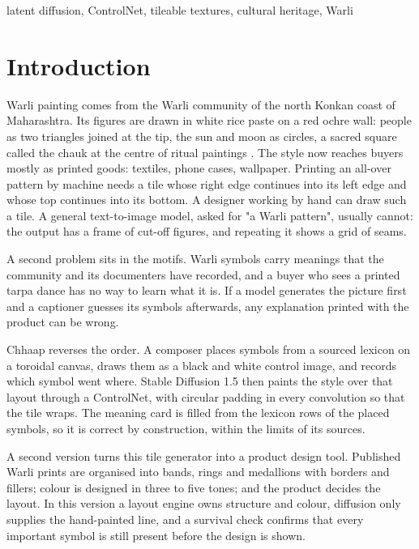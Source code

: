 \documentclass[conference]{IEEEtran}
\begin{document}
\begin{IEEEkeywords}
latent diffusion, ControlNet, tileable textures, cultural heritage, Warli
\end{IEEEkeywords}

\section{Introduction}

Warli painting comes from the Warli community of the north Konkan coast of Maharashtra. Its figures are drawn in white rice paste on a red ochre wall: people as two triangles joined at the tip, the sun and moon as circles, a sacred square called the chauk at the centre of ritual paintings \cite{dsource_warli,wiki_warli}. The style now reaches buyers mostly as printed goods: textiles, phone cases, wallpaper. Printing an all-over pattern by machine needs a tile whose right edge continues into its left edge and whose top continues into its bottom. A designer working by hand can draw such a tile. A general text-to-image model, asked for "a Warli pattern", usually cannot: the output has a frame of cut-off figures, and repeating it shows a grid of seams.

A second problem sits in the motifs. Warli symbols carry meanings that the community and its documenters have recorded, and a buyer who sees a printed tarpa dance has no way to learn what it is. If a model generates the picture first and a captioner guesses its symbols afterwards, any explanation printed with the product can be wrong.

Chhaap reverses the order. A composer places symbols from a sourced lexicon on a toroidal canvas, draws them as a black and white control image, and records which symbol went where. Stable Diffusion 1.5 then paints the style over that layout through a ControlNet, with circular padding in every convolution so that the tile wraps. The meaning card is filled from the lexicon rows of the placed symbols, so it is correct by construction, within the limits of its sources.

A second version turns this tile generator into a product design tool. Published Warli prints are organised into bands, rings and medallions with borders and fillers; colour is designed in three to five tones; and the product decides the layout. In this version a layout engine owns structure and colour, diffusion only supplies the hand-painted line, and a survival check confirms that every important symbol is still present before the design is shown.
\end{document}
